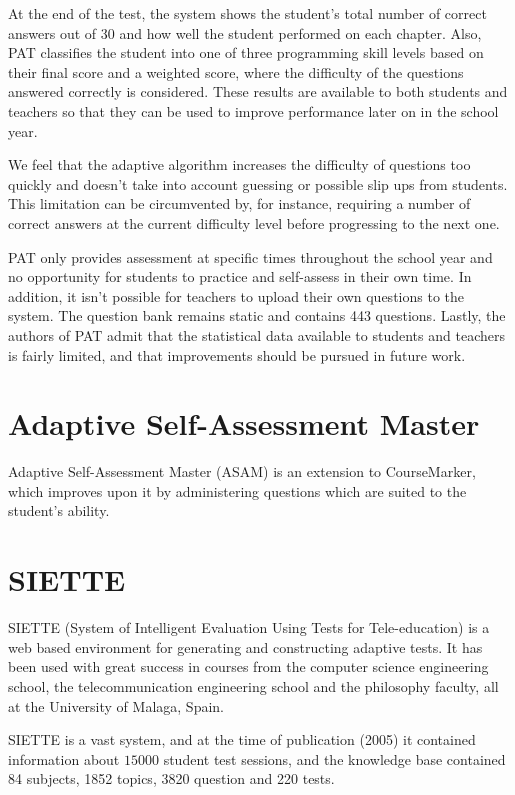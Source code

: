 At the end of the test, the system shows the student's total number of correct answers out of 30 and how well the student performed on each chapter. Also, PAT classifies the student into one of three programming skill levels based on their final score and a weighted score, where the difficulty of the questions answered correctly is considered. These results are available to both students and teachers so that they can be used to improve performance later on in the school year.\newline

We feel that the adaptive algorithm increases the difficulty of questions too quickly and doesn't take into account guessing or possible slip ups from students. This limitation can be circumvented by, for instance, requiring a number of correct answers at the current difficulty level before progressing to the next one.\newline

PAT only provides assessment at specific times throughout the school year and no opportunity for students to practice and self-assess in their own time. In addition, it isn't possible for teachers to upload their own questions to the system. The question bank remains static and contains 443 questions. Lastly, the authors of PAT admit that the statistical data available to students and teachers is fairly limited, and that improvements should be pursued in future work.

\section{Adaptive Self-Assessment Master}
Adaptive Self-Assessment Master (ASAM) is an extension to CourseMarker, which improves upon it by administering questions which are suited to the student's ability.

\section{SIETTE}
SIETTE\cite{SIETTE-small} (System of Intelligent Evaluation Using Tests for Tele-education) is a web based environment for generating and constructing adaptive tests. It has been used with great success in courses from the computer science engineering school, the telecommunication engineering school and the philosophy faculty, all at the University of Malaga, Spain.\newline

SIETTE is a vast system, and at the time of publication (2005) it contained information about $15000$ student test sessions, and the knowledge base contained 84 subjects, 1852 topics, 3820 question and 220 tests.\newline

